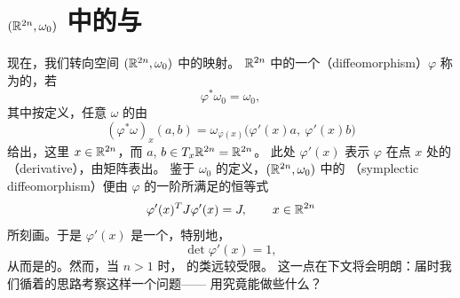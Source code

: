 
\section[\trSymplecticDiffeomorphism{}与\trHamiltonianVectorField]{$(\mathbb{R}^{2n},\omega_0)$ 中的\trSymplecticDiffeomorphism{}与\trHamiltonianVectorField}
\label{sec:symplectic-diffeomorphisms}

现在，我们转向\trSymplectic{}空间 $(\mathbb{R}^{2n},\omega_0)$ 中的\trNonlinear{}映射。%
$\mathbb{R}^{2n}$ 中的一个\textbf{\trDiffeomorphism}（diffeomorphism）$\varphi$ 称为\trSymplectic{}的，若
\begin{equation}\label{eq:symplectic-diffeomorphism}
\varphi^{*}\omega_0=\omega_0,
\end{equation}
其中按定义，任意\trTwoForm{} $\omega$ 的\trPullback{}由
\[
(\varphi^{*}\omega)_x(a,b)=\omega_{\varphi(x)}\bigl(\varphi'(x)a,\ \varphi'(x)b\bigr)
\]
给出，这里 $x\in\mathbb{R}^{2n}$，而 $a$, $b\in T_{x}\mathbb{R}^{2n}=\mathbb{R}^{2n}$。%
此处 $\varphi'(x)$ 表示 $\varphi$ 在点 $x$ 处的\textbf{\trDerivative}（derivative），由\trJacobi{}矩阵表出。%
鉴于 $\omega_0$ 的定义，$(\mathbb{R}^{2n},\omega_0)$ 中的%
\textbf{\trSymplecticDiffeomorphism}（symplectic diffeomorphism）便由 $\varphi$ 的一阶\trDerivative{}所满足的恒等式
\begin{equation}\label{eq:first-derivative-identity}
\varphi'(x)^{T}J\varphi'(x)=J,\qquad x\in\mathbb{R}^{2n}
\end{equation}
所刻画。于是 $\varphi'(x)$ 是一个\trSymplecticMatrix，特别地，
\begin{equation}\label{eq:det-first-derivative}
\det\varphi'(x)=1,
\end{equation}
从而\trSymplecticDiffeomorphism{}是\trVolumePreserving{}的。然而，当 $n>1$ 时，%
\trSymplecticDiffeomorphism{}的类远较\trVolumePreserving{}\trDiffeomorphism{}受限。%
这一点在下文将会明朗：届时我们循着\trGromov{}的思路考察这样一个问题——%
用\trSymplecticDiffeomorphism{}究竟能做些什么？

